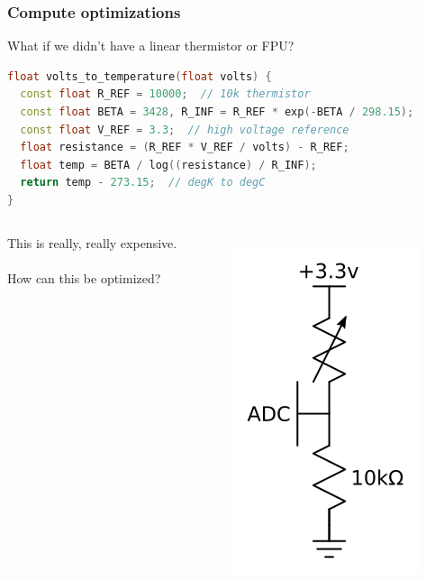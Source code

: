 \documentclass{beamer}
\begin{document}
\begin{frame}[fragile]
\frametitle{Compute optimizations}
What if we didn't have a linear thermistor or FPU?
\begin{lstlisting}[language=C++,basicstyle=\ttfamily\scriptsize]
float volts_to_temperature(float volts) {
  const float R_REF = 10000;  // 10k thermistor
  const float BETA = 3428, R_INF = R_REF * exp(-BETA / 298.15);
  const float V_REF = 3.3;  // high voltage reference
  float resistance = (R_REF * V_REF / volts) - R_REF;
  float temp = BETA / log((resistance) / R_INF);
  return temp - 273.15;  // degK to degC
}
\end{lstlisting}
\begin{columns}[t]
This is really, really expensive. \\
\hfill \\
How can this be optimized?
\begin{figure}[h!]
\includegraphics[width=0.8\columnwidth]{images/thermistor} \\

\end{figure}
\end{columns}
\end{frame}
\end{document}
